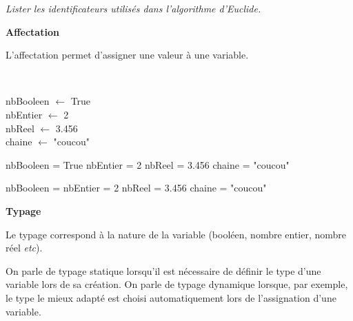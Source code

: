 \documentclass[10pt,fleqn]{article} %
\begin{document}
\begin{exemple}
\textit{Lister les identificateurs utilisés dans l'algorithme d'Euclide.}
\end{exemple}


\begin{defi}
\textbf{Affectation}

L'affectation permet d'assigner une valeur à une variable.
\end{defi}

\begin{minipage}[c]{.1\linewidth}
\begin{exemple}
$\;$

\vspace{1.5cm}
\end{exemple}
\end{minipage} \hfill
\begin{minipage}[c]{.28\linewidth}
\begin{pseudo}
\begin{algorithm}[H]
nbBooleen $\gets$ True\\
nbEntier $\gets$ 2\\
nbReel $\gets$ 3.456\\
chaine $\gets$ "coucou"\\
\end{algorithm}
\end{pseudo}
\end{minipage}\hfill
\begin{minipage}[c]{.2\linewidth}
\begin{py}
\begin{python}
nbBooleen = True
nbEntier = 2
nbReel = 3.456
chaine = "coucou"
\end{python}
\end{py}
\end{minipage}\hfill
\begin{minipage}[c]{.2\linewidth}
\begin{sci}
\begin{scilab}
nbBooleen = %
nbEntier = 2
nbReel = 3.456
chaine = "coucou"
\end{scilab}
\end{sci}
\end{minipage}


\begin{defi}
\textbf{Typage}

Le typage correspond à la nature de la variable (booléen, nombre entier, nombre réel \textit{etc}). 

On parle de typage statique lorsqu'il est nécessaire de définir le type d'une variable lors de sa création. On parle de typage dynamique lorsque, par exemple, le type le mieux adapté est choisi automatiquement lors de l'assignation d'une variable.
\end{defi}
\end{document}
